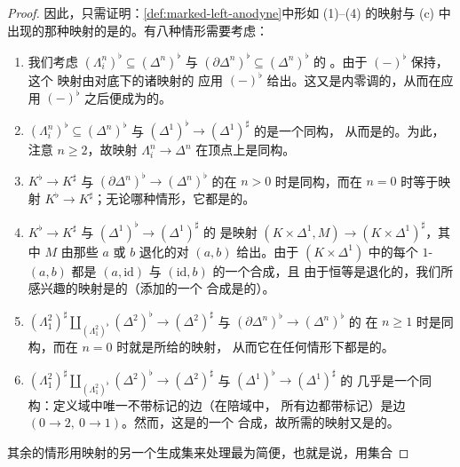 \begin{proof}
因此，只需证明：\cref{def:marked-left-anodyne}中形如 (1)--(4) 的映射与 (c) 中
出现的那种映射的\trPushoutProduct{}是\trMarkedAnodyne{}的。有八种情形需要考虑：
\begin{enumerate}[label=(\arabic*)]
  \item 我们考虑 $(\Lambda^n_i)^\flat \subseteq (\Delta^n)^\flat$ 与
        $(\partial\Delta^n)^\flat \subseteq (\Delta^n)^\flat$ 的%
        \trPushoutProduct{}。由于 $(-)^\flat$ 保持\trColimit{}，这个%
        \trPushoutProduct{}映射由对底下的诸\trSimplicialSet{}映射的%
        \trPushoutProduct{}应用 $(-)^\flat$ 给出。这又是内零调的，从而在应用
        $(-)^\flat$ 之后便成为\trMarkedAnodyne{}的。
  \item $(\Lambda^n_i)^\flat \subseteq (\Delta^n)^\flat$ 与
        $(\Delta^1)^\flat \to (\Delta^1)^\sharp$ 的\trPushoutProduct{}是一个同构，
        从而是\trMarkedAnodyne{}的。为此，注意 $n \ge 2$，故映射
        $\Lambda^n_i \to \Delta^n$ 在顶点上是同构。
  \item $K^\flat \to K^\sharp$ 与 $(\partial\Delta^n)^\flat \to (\Delta^n)^\flat$
        的\trPushoutProduct{}在 $n > 0$ 时是同构，而在 $n = 0$ 时等于映射
        $K^\flat \to K^\sharp$；无论哪种情形，它都是\trMarkedAnodyne{}的。
  \item $K^\flat \to K^\sharp$ 与 $(\Delta^1)^\flat \to (\Delta^1)^\sharp$ 的%
        \trPushoutProduct{}是映射 $(K \times \Delta^1, M) \to (K \times \Delta^1)^\sharp$，其中 $M$ 由那些 $a$ 或 $b$ 退化的对
        $(a, b)$ 给出。由于 $(K \times \Delta^1)$ 中的每个 $1$-\trSimplex{}%
        $(a, b)$ 都是 $(a, \mathrm{id})$ 与 $(\mathrm{id}, b)$ 的一个合成，且
        由于恒等是退化的，我们所感兴趣的映射是\trMarkedAnodyne{}的（添加\trMarkedEdge{}的一个
        合成是\trMarkedAnodyne{}的）。
  \item $(\Lambda^2_1)^\sharp \amalg_{(\Lambda^2_1)^\flat} (\Delta^2)^\flat \to (\Delta^2)^\sharp$ 与 $(\partial\Delta^n)^\flat \to (\Delta^n)^\flat$ 的%
        \trPushoutProduct{}在 $n \ge 1$ 时是同构，而在 $n = 0$ 时就是所给的映射，
        从而它在任何情形下都是\trMarkedAnodyne{}的。
  \item $(\Lambda^2_1)^\sharp \amalg_{(\Lambda^2_1)^\flat} (\Delta^2)^\flat \to (\Delta^2)^\sharp$ 与 $(\Delta^1)^\flat \to (\Delta^1)^\sharp$ 的%
        \trPushoutProduct{}几乎是一个同构：定义域中唯一不带标记的边（在陪域中，
        所有边都带标记）是边 $(0 \to 2,\ 0 \to 1)$。然而，这是\trMarkedEdge{}的一个
        合成，故所需的映射又是\trMarkedAnodyne{}的。
\end{enumerate}
其余的情形用\trMarkedLeftAnodyne{}映射的另一个生成集来处理最为简便，也就是说，用集合

\end{proof}
